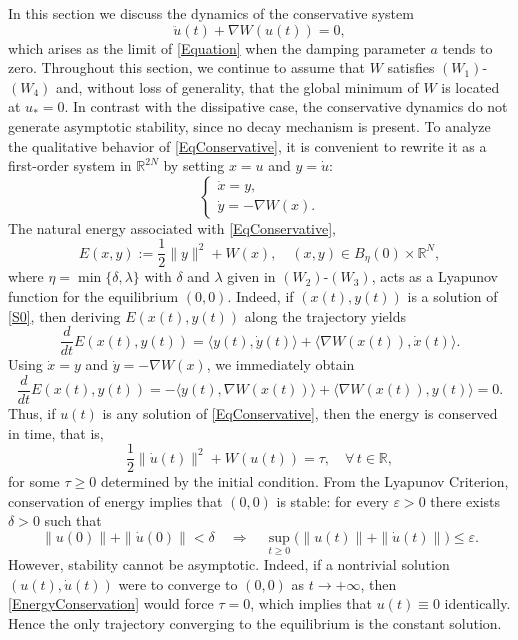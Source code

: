 \documentclass[12pt]{amsart}
\numberwithin{equation}{section}
\begin{document}
In this section we discuss the dynamics of the conservative system
\begin{equation}\label{EqConservative}
	\ddot{u}(t) + \nabla W(u(t)) = 0,
\end{equation}
which arises as the limit of \eqref{Equation} when the damping parameter $a$ tends to zero. Throughout this section, we continue to assume that $W$ satisfies \hyperlink{W1}{$(W_1)$}-\hyperlink{W4}{$(W_4)$} and, without loss of generality, that the global minimum of $W$ is located at $u_*=0$. In contrast with the dissipative
case, the conservative dynamics do not generate asymptotic stability, since no decay mechanism is present. To analyze the qualitative behavior of \eqref{EqConservative}, it is convenient to rewrite it as a first-order system in $\mathbb{R}^{2N}$ by setting $x=u$ and $y=\dot{u}$:
\begin{equation}\label{S0}
	\begin{cases}
		\dot{x} = y,\\[2mm]
		\dot{y} = -\nabla W(x).
	\end{cases}
\end{equation}
The natural energy associated with \eqref{EqConservative},
$$
E(x,y) := \frac12\|y\|^2 + W(x), \quad (x,y)\in B_\eta(0)\times \mathbb{R}^N,
$$
where $\eta=\min\{\delta,\lambda\}$ with $\delta$ and $\lambda$ given in \hyperlink{W2}{$(W_2)$}-\hyperlink{W3}{$(W_3)$}, acts as a Lyapunov function for the equilibrium $(0,0)$. Indeed, if $(x(t),y(t))$ is a solution of \eqref{S0}, then deriving 
$E(x(t),y(t))$ along the trajectory yields
$$
\frac{d}{dt}E(x(t),y(t))= \langle y(t),\dot{y}(t)\rangle + \langle \nabla W(x(t)),\dot{x}(t)\rangle.
$$
Using $\dot{x}=y$ and $\dot{y}=-\nabla W(x)$, we immediately obtain
$$
\frac{d}{dt}E(x(t),y(t))= -\langle y(t),\nabla W(x(t))\rangle+ \langle \nabla W(x(t)),y(t)\rangle= 0.
$$
Thus, if $u(t)$ is any solution of \eqref{EqConservative}, then the energy is conserved in time, that is,
\begin{equation}\label{EnergyConservation}
	\frac12\|\dot{u}(t)\|^2 + W(u(t)) = \tau,\quad \forall\, t\in\mathbb{R},
\end{equation}
for some $\tau\ge 0$ determined by the initial condition. From the Lyapunov Criterion, conservation of energy implies that 
$(0,0)$ is stable: for every $\varepsilon>0$ there exists 
$\delta>0$ such that
$$
\|u(0)\| + \|\dot{u}(0)\| < \delta\quad\Longrightarrow\quad\sup_{t\ge 0} \big( \|u(t)\| + \|\dot{u}(t)\| \big) \le \varepsilon.
$$
However, stability cannot be asymptotic. Indeed, if a nontrivial solution $(u(t),\dot{u}(t))$ were to converge to $(0,0)$ as $t\to+\infty$, then \eqref{EnergyConservation} would force $\tau=0$, which implies that $u(t)\equiv 0$ identically. Hence the only trajectory converging to the equilibrium is the constant solution.
\end{document}
